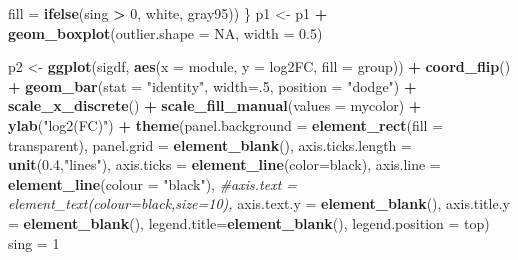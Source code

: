 \documentclass[
]{article}
\newenvironment{Shaded}{\begin{snugshade}}{\end{snugshade}}
\newcommand{\AttributeTok}[1]{\textcolor[rgb]{0.13,0.29,0.53}{#1}}
\newcommand{\CommentTok}[1]{\textcolor[rgb]{0.56,0.35,0.01}{\textit{#1}}}
\newcommand{\ConstantTok}[1]{\textcolor[rgb]{0.56,0.35,0.01}{#1}}
\newcommand{\DecValTok}[1]{\textcolor[rgb]{0.00,0.00,0.81}{#1}}
\newcommand{\FloatTok}[1]{\textcolor[rgb]{0.00,0.00,0.81}{#1}}
\newcommand{\FunctionTok}[1]{\textcolor[rgb]{0.13,0.29,0.53}{\textbf{#1}}}
\newcommand{\NormalTok}[1]{#1}
\newcommand{\OtherTok}[1]{\textcolor[rgb]{0.56,0.35,0.01}{#1}}
\newcommand{\SpecialCharTok}[1]{\textcolor[rgb]{0.81,0.36,0.00}{\textbf{#1}}}
\newcommand{\StringTok}[1]{\textcolor[rgb]{0.31,0.60,0.02}{#1}}
\begin{document}
\begin{Shaded}
\begin{Highlighting}[]
                      \AttributeTok{fill =} \FunctionTok{ifelse}\NormalTok{(sing }\SpecialCharTok{\textgreater{}} \DecValTok{0}\NormalTok{, }\StringTok{\textquotesingle{}white\textquotesingle{}}\NormalTok{, }\StringTok{\textquotesingle{}gray95\textquotesingle{}}\NormalTok{))}
\NormalTok{\}}
\NormalTok{p1 }\OtherTok{\textless{}{-}}\NormalTok{ p1 }\SpecialCharTok{+} \FunctionTok{geom\_boxplot}\NormalTok{(}\AttributeTok{outlier.shape =} \ConstantTok{NA}\NormalTok{, }\AttributeTok{width =} \FloatTok{0.5}\NormalTok{)}

\NormalTok{p2 }\OtherTok{\textless{}{-}} \FunctionTok{ggplot}\NormalTok{(sigdf, }\FunctionTok{aes}\NormalTok{(}\AttributeTok{x =}\NormalTok{ module, }\AttributeTok{y =}\NormalTok{ log2FC, }\AttributeTok{fill =}\NormalTok{ group)) }\SpecialCharTok{+}  \FunctionTok{coord\_flip}\NormalTok{() }\SpecialCharTok{+} 
      \FunctionTok{geom\_bar}\NormalTok{(}\AttributeTok{stat =} \StringTok{"identity"}\NormalTok{, }\AttributeTok{width=}\NormalTok{.}\DecValTok{5}\NormalTok{, }\AttributeTok{position =} \StringTok{"dodge"}\NormalTok{) }\SpecialCharTok{+} \FunctionTok{scale\_x\_discrete}\NormalTok{() }\SpecialCharTok{+}
      \FunctionTok{scale\_fill\_manual}\NormalTok{(}\AttributeTok{values =}\NormalTok{ mycolor) }\SpecialCharTok{+} \FunctionTok{ylab}\NormalTok{(}\StringTok{"log2(FC)"}\NormalTok{) }\SpecialCharTok{+}
      \FunctionTok{theme}\NormalTok{(}\AttributeTok{panel.background =} \FunctionTok{element\_rect}\NormalTok{(}\AttributeTok{fill =} \StringTok{\textquotesingle{}transparent\textquotesingle{}}\NormalTok{),}
        \AttributeTok{panel.grid =} \FunctionTok{element\_blank}\NormalTok{(),}
        \AttributeTok{axis.ticks.length =} \FunctionTok{unit}\NormalTok{(}\FloatTok{0.4}\NormalTok{,}\StringTok{"lines"}\NormalTok{),}
        \AttributeTok{axis.ticks =} \FunctionTok{element\_line}\NormalTok{(}\AttributeTok{color=}\StringTok{\textquotesingle{}black\textquotesingle{}}\NormalTok{),}
        \AttributeTok{axis.line =} \FunctionTok{element\_line}\NormalTok{(}\AttributeTok{colour =} \StringTok{"black"}\NormalTok{),}
        \CommentTok{\#axis.text = element\_text(colour=\textquotesingle{}black\textquotesingle{},size=10),}
        \AttributeTok{axis.text.y =} \FunctionTok{element\_blank}\NormalTok{(),}
        \AttributeTok{axis.title.y =} \FunctionTok{element\_blank}\NormalTok{(),}
        \AttributeTok{legend.title=}\FunctionTok{element\_blank}\NormalTok{(),}
        \AttributeTok{legend.position =} \StringTok{\textquotesingle{}top\textquotesingle{}}\NormalTok{)}
\NormalTok{sing }\OtherTok{=} \DecValTok{1}

\end{Highlighting}
\end{Shaded}
\end{document}
